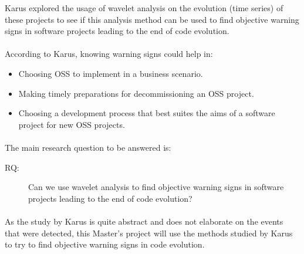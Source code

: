 Karus explored the usage of wavelet analysis on the evolution (time series) of
these projects to see if this analysis method can be used to find objective
warning signs in software projects leading to the end of code evolution.

\paragraph{}
According to Karus, knowing warning signs could help in:
\begin{itemize}
	\item Choosing OSS to implement in a business scenario.
	\item Making timely preparations for decommissioning an OSS project.
	\item Choosing a development process that best suites the aims of a software
	project for new OSS projects.
\end{itemize}

\paragraph{}
The main research question to be answered is:
\begin{description}
	\item[RQ:] Can we use wavelet analysis to find objective warning signs in
	software projects leading to the end of code evolution?
\end{description}
\cite{karus2013}

\paragraph{}
As the study by Karus is quite abstract and does not elaborate on the events
that were detected, this Master's project will use the methods studied by
Karus to try to find objective warning signs in code evolution.
